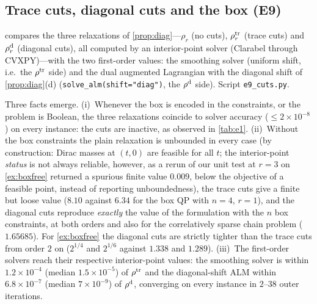 \documentclass[a4paper,11pt]{article}
\newcommand{\fitbox}[1]{\sbox{\tabbox}{#1}\ifdim\wd\tabbox>\textwidth\resizebox{\textwidth}{!}{\usebox{\tabbox}}\else\usebox{\tabbox}\fi}
\theoremstyle{plain}
\theoremstyle{definition}
\theoremstyle{remark}
\begin{document}
\subsection{Trace cuts, diagonal cuts and the box (E9)}\label{sec:e9}
 compares the three relaxations of \cref{prop:diag}---$\rho_r$ (no cuts), $\rho_r^{\rm tr}$ (trace cuts) and $\rho_r^{\rm d}$ (diagonal cuts), all computed by an interior-point solver (Clarabel through CVXPY)---with the two first-order values: the smoothing solver (uniform shift, i.e.\ the $\rho^{\rm tr}$ side) and the dual augmented Lagrangian with the diagonal shift of \cref{prop:diag}(d) (\texttt{solve\_alm(shift="diag")}, the $\rho^{\rm d}$ side). Script \texttt{e9\_cuts.py}.
\begin{table}[t]\centering\scriptsize
\setlength{\tabcolsep}{3pt}
\fitbox{}
\caption{The three relaxations of \cref{prop:diag} (interior point) and the first-order values on the two sides. ``+box'' / ``no box'': with / without the explicit constraints $1-x_i^2\ge0$. $+\infty$: the solver reports unboundedness.}\label{tab:e9a}
\end{table}
\begin{table}[t]\centering\scriptsize
\setlength{\tabcolsep}{3pt}
\fitbox{}
\caption{Box QP ($\max x^\top Qx$, $r=2$): the usual formulation with $n$ box constraints and the uniform shift against the formulation \emph{without} box constraints and the diagonal shift (one block, $\binom{n+2}{2}$ shift variables). Times in seconds on a shared machine (indicative only).}\label{tab:e9b}
\end{table}
Three facts emerge. (i)~Whenever the box is encoded in the constraints, or the problem is Boolean, the three relaxations coincide to solver accuracy ($\le2\times10^{-8}$) on every instance: the cuts are inactive, as observed in \cref{tab:e1}. (ii)~Without the box constraints the plain relaxation is unbounded in every case (by construction: Dirac masses at $(t,0)$ are feasible for all $t$; the interior-point \emph{status} is not always reliable, however, as a rerun of our unit test at $r=3$ on \cref{ex:boxfree} returned a spurious finite value $0.009$, below the objective of a feasible point, instead of reporting unboundedness), the trace cuts give a finite but loose value ($8.10$ against $6.34$ for the box QP with $n=4$, $r=1$), and the diagonal cuts reproduce \emph{exactly} the value of the formulation with the $n$ box constraints, at both orders and also for the correlatively sparse chain problem ($1.65685$). For \cref{ex:boxfree} the diagonal cuts are strictly tighter than the trace cuts from order $2$ on ($2^{1/4}$ and $2^{1/6}$ against $1.338$ and $1.289$). (iii)~The first-order solvers reach their respective interior-point values: the smoothing solver is within $1.2\times10^{-4}$ (median $1.5\times10^{-5}$) of $\rho^{\rm tr}$ and the diagonal-shift ALM within $6.8\times10^{-7}$ (median $7\times10^{-9}$) of $\rho^{\rm d}$, converging on every instance in $2$--$38$ outer iterations.
\end{document}
